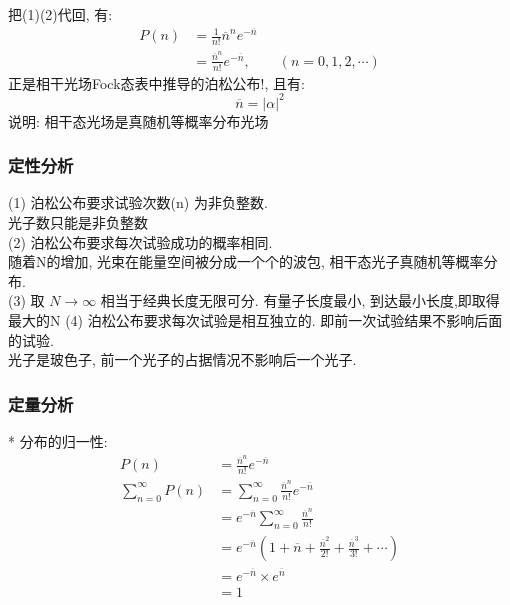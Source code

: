 \begin{frame}
 \frametitle{}
      把(1)(2)代回, 有: 
      \[\begin{aligned}
        P(n) &= \frac{1}{n!} \overline{n}^n e^{-\overline{n}}  \\ 
        &= \frac{\overline{n}^n}{n!} e^{-\overline{n}}, \qquad (n=0, 1, 2, \cdots )
    \end{aligned}\]
    正是相干光场Fock态表中推导的泊松公布!, 且有:
    \[ \overline{n}= \left|\alpha\right|^2\]
    说明: 相干态光场是真随机等概率分布光场
\end{frame}

\begin{frame}
 \frametitle{定性分析}
     (1)  泊松公布要求试验次数(n) 为非负整数. \\ 
     {\Bullet}光子数只能是非负整数 \\ {\vspace*{0.3em}}
     (2)  泊松公布要求每次试验成功的概率相同. \\ 
     {\Bullet}随着N的增加, 光束在能量空间被分成一个个的波包, 相干态光子真随机等概率分布. \\ {\vspace*{0.3em}}
     (3)  取 $ N \to \infty $ 相当于经典长度无限可分. 有量子长度最小, 到达最小长度,即取得最大的N
     (4)  泊松公布要求每次试验是相互独立的. 即前一次试验结果不影响后面的试验. \\ 
     {\Bullet}光子是玻色子, 前一个光子的占据情况不影响后一个光子. \\ {\vspace*{0.3em}}
\end{frame}

\begin{frame}
 \frametitle{定量分析}
    * 分布的归一性: 
    \[\begin{aligned}
        P(n) &= \frac{\overline{n}^n}{n!} e^{-\overline{n}} \\ 
        \sum_{n=0} ^{\infty} P(n) &= \sum_{n=0} ^{\infty}\frac{\overline{n}^n}{n!} e^{-\overline{n}}  \\ 
        &= e^{-\overline{n}} \sum_{n=0} ^{\infty}\frac{\overline{n}^n}{n!} \\ 
        &= e^{-\overline{n}} \left( 1+ \overline{n} + \frac{\overline{n}^2}{2!} +\frac{\overline{n}^3}{3!} + \cdots \right) \\ 
        &= e^{-\overline{n}} \times e^{\overline{n}}  \\ 
        &= 1
    \end{aligned}\]   
\end{frame}

